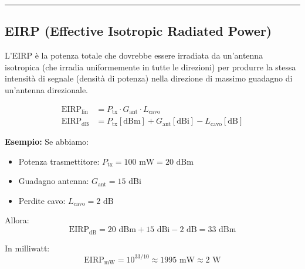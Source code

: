 \hrule %

\subsection{EIRP (Effective Isotropic Radiated Power)}
L'EIRP è la potenza totale che dovrebbe essere irradiata da un'antenna isotropica (che irradia uniformemente in tutte le direzioni) per produrre la stessa intensità di segnale (densità di potenza) nella direzione di massimo guadagno di un'antenna direzionale.

\begin{align*}
    \text{EIRP}_{\text{lin}} &= P_{\text{tx}} \cdot G_{\text{ant}} \cdot L_{\text{cavo}} \\
    \text{EIRP}_{\text{dB}} &= P_{\text{tx}}[\text{dBm}] + G_{\text{ant}}[\text{dBi}] - L_{\text{cavo}}[\text{dB}]
\end{align*}

\textbf{Esempio:} Se abbiamo:
\begin{itemize}
    \item Potenza trasmettitore: $P_{\text{tx}} = 100\text{ mW} = 20\text{ dBm}$ 
    \item Guadagno antenna: $G_{\text{ant}} = 15\text{ dBi}$
    \item Perdite cavo: $L_{\text{cavo}} = 2\text{ dB}$
\end{itemize}

Allora:
\[ \text{EIRP}_{\text{dB}} = 20\text{ dBm} + 15\text{ dBi} - 2\text{ dB} = 33\text{ dBm} \]

In milliwatt:
\[ \text{EIRP}_{\text{mW}} = 10^{33/10} \approx 1995\text{ mW} \approx 2\text{ W} \]

